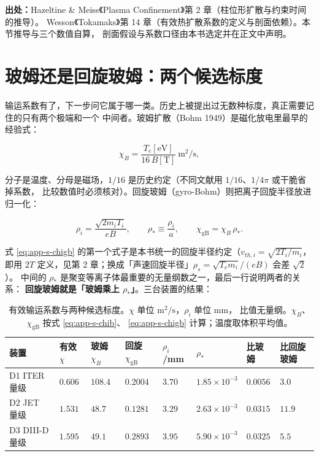 {\footnotesize
\textbf{出处：}Hazeltine \& Meiss《Plasma Confinement》第 2 章（柱位形扩散与约束时间的推导）。
Wesson《Tokamaks》第 14 章（有效热扩散系数的定义与剖面依赖）。本节推导与三个数值自算，
剖面假设与系数口径由本书选定并在正文中声明。
}


\section{玻姆还是回旋玻姆：两个候选标度}
\label{sec:app-s-bohm}

输运系数有了，下一步问它属于哪一类。历史上被提出过无数种标度，真正需要记住的只有两个极端和一个
中间者。玻姆扩散（Bohm 1949）是磁化放电里最早的经验式：

\begin{equation}
\chi_B=\frac{T_e[\mathrm{eV}]}{16\,B[\mathrm{T}]}\ \mathrm{m^2/s},
\label{eq:app-s-chib}
\end{equation}

分子是温度、分母是磁场，$1/16$ 是历史约定（不同文献用 $1/16$、$1/4\pi$ 或干脆省掉系数，
比较数值时必须核对）。回旋玻姆（gyro-Bohm）则把离子回旋半径放进归一化：

\begin{equation}
\rho_i=\frac{\sqrt{2m_iT_i}}{eB},
\qquad
\rho_\ast\equiv\frac{\rho_i}{a},
\qquad
\chi_{\mathrm{gB}}=\chi_B\,\rho_\ast .
\label{eq:app-s-chigb}
\end{equation}

式 \eqref{eq:app-s-chigb} 的第一个式子是本书统一的回旋半径约定（$v_{th,i}=\sqrt{2T_i/m_i}$，
即用 $2T$ 定义，见第 2 章；换成「声速回旋半径」$\rho_s=\sqrt{T_em_i}/(eB)$ 会差 $\sqrt2$）。
中间的 $\rho_\ast$ 是聚变等离子体最重要的无量纲数之一，最后一行说明两者的关系：
\textbf{回旋玻姆就是「玻姆乘上 $\rho_\ast$」}。三台装置的结果：

\begin{table}[htbp]
  \centering
  \caption{有效输运系数与两种候选标度。$\chi$ 单位 $\mathrm{m^2/s}$，$\rho_i$ 单位 mm，
    比值无量纲。$\chi_B$、$\chi_{\mathrm{gB}}$ 按式 \eqref{eq:app-s-chib}、
    \eqref{eq:app-s-chigb} 计算；温度取体积平均值。}
  \label{tab:app-s-transport}
  \begin{tabular}{@{}p{2.6cm}p{1.5cm}p{1.5cm}p{1.5cm}p{1.3cm}p{1.5cm}p{1.5cm}p{1.9cm}@{}}
    \toprule
    装置 & 有效 $\chi$ & 玻姆 $\chi_B$ & 回旋 $\chi_{\mathrm{gB}}$ & $\rho_i$/mm & $\rho_\ast$ & 比玻姆 & 比回旋玻姆 \\
    \midrule
    D1 ITER 量级 & $0.606$ & $108.4$ & $0.2004$ & $3.70$ & $1.85\times10^{-3}$ & $0.0056$ & $3.0$ \\
    D2 JET 量级 & $1.531$ & $48.7$ & $0.1281$ & $3.29$ & $2.63\times10^{-3}$ & $0.0315$ & $11.9$ \\
    D3 DIII-D 量级 & $1.595$ & $49.1$ & $0.2893$ & $3.95$ & $5.90\times10^{-3}$ & $0.0325$ & $5.5$ \\
    \bottomrule
  \end{tabular}
\end{table}

